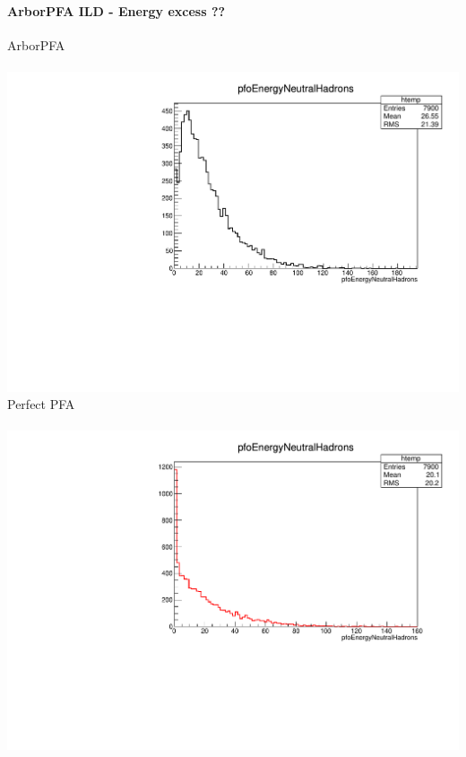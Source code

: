 \documentclass[8pt]{beamer}
\begin{document}
    \begin{frame}
    \frametitle{\backup}
    \framesubtitle{ArborPFA ILD - Energy excess ??}
      \begin{minipage}{0.48\linewidth}
        \begin{center}
          ArborPFA \\
          ~~~~~\includegraphics[width=\linewidth]{pfoEnergyNeutralHadrons_ArborPFA.pdf} \\
          Perfect PFA \\
          ~~~~~\includegraphics[width=\linewidth]{pfoEnergyNeutralHadrons_PerfectPFA.pdf} \\
        \end{center}
      \end{minipage}
      \begin{minipage}{0.48\linewidth}

\end{minipage}
\end{frame}
\end{document}

